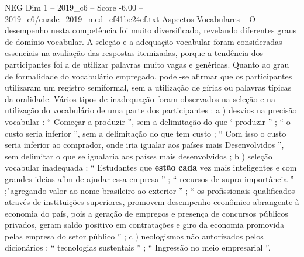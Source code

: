 \begin{textsample}{NEG Dim 1 – 2019\_c6 – Score -6.00 – 2019\_c6/enade\_2019\_med\_cf41be24ef.txt}
Aspectos Vocabulares – O desempenho nesta competência foi muito diversificado, revelando diferentes graus de domínio vocabular.
A seleção e a adequação vocabular foram consideradas essenciais na avaliação das respostas itemizadas, porque a tendência dos participantes foi a de utilizar palavras muito vagas e genéricas.
Quanto ao grau de formalidade do vocabulário empregado, pode -se afirmar que os participantes utilizaram um registro semiformal, sem a utilização de gírias ou palavras típicas da oralidade.
Vários tipos de inadequação foram observados na seleção e na utilização do vocabulário de uma parte dos participantes : a ) desvios na precisão vocabular : “ Começar a produzir ”, sem a delimitação do que ‘ produzir ” ; “ o custo seria inferior ”, sem a delimitação do que tem custo ; “ Com isso o custo seria inferior ao comprador, onde iria igualar aos países mais Desenvolvidos ”, sem delimitar o que se igualaria aos países mais desenvolvidos ; b ) seleção vocabular inadequada : “ Estudantes que \textbf{estão} \textbf{cada} vez mais inteligentes e com grandes ideias afim de ajudar essa empresa ” ; “ recursos de supra importância ” ;"agregando valor ao nome brasileiro ao exterior ” ; “ os profissionais qualificados através de instituições superiores, promovem desempenho econômico abrangente à economia do país, pois a geração de empregos e presença de concursos públicos privados, geram saldo positivo em contratações e giro da economia promovida pelas empresa do setor público ” ; c ) neologismos não autorizados pelos dicionários : “ tecnologias sustentais ” ; “ Ingressão no meio empresarial ”.

\end{textsample}
